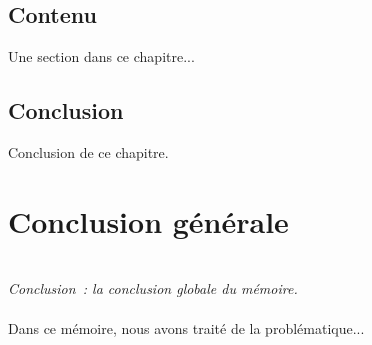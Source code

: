 \documentclass[a4paper,11pt,twoside]{memoir}
\begin{document}
\section{Contenu}
Une section dans ce chapitre...

\section{Conclusion}
Conclusion de ce chapitre.



\cleardoublepage{} %
\chapter*{Conclusion générale}
\adjustmtc
{}
\textit{\\Conclusion~: la conclusion globale du mémoire.}\\\\
Dans ce mémoire, nous avons traité de la problématique...



\cleardoublepage{}
 

\appendix
\cleardoublepage{}

%



\cleardoublepage %
\printindex %

\end{document}

